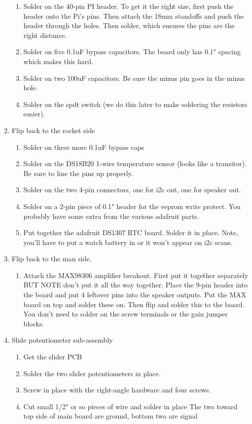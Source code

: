 \documentclass[11pt]{article}
\begin{document}
\begin{enumerate}
	\begin{enumerate}
		\item Solder on the 40-pin PI header.
			To get it the right size, first push the header onto the Pi's pins.
			Then attach the 18mm standoffs and push the header through the holes.
			Then solder, which ensures the pins are the right distance.
		\item Solder on five 0.1uF bypass capacitors.
			The board only has 0.1" spacing which makes this hard.
		\item Solder on two 100uF capacitors.
			 Be sure the minus pin goes in the minus hole.
		\item	Solder on the spdt switch
			(we do this later to make soldering the resistors easier).
	\end{enumerate}
\item	Flip back to the rocket side
	\begin{enumerate}
		\item Solder on three more 0.1uF bypass caps
		\item Solder on the DS18B20 1-wire temperature sensor (looks like
			a transitor).
                      Be sure to line the pins up properly.
		\item Solder on the two 4-pin connectors, one for i2c out, one for
			speaker out.
		\item Solder on a 2-pin piece of 0.1" header for the eeprom write
			protect.
			You probably have some extra from the various adafruit parts.
		\item Put together the adafruit DS1307 RTC board.  Solder it in place.
			Note, you'll have to put a watch battery in or it won't appear
			on i2c scans.
	\end{enumerate}
\item Flip back to the man side.
	\begin{enumerate}
		\item Attach the MAX98306 amplifier breakout.
			First put it together separately BUT NOTE don't put it all the
			way together.
			Place the 9-pin header into the board and put 4 leftover pins
			into the speaker outputs.  Put the MAX board on top and solder these on.
			Then flip and solder this to the board.  You don't need to solder on
			the screw terminals or the gain jumper blocks.
	\end{enumerate}
	
\item Slide potentiometer sub-assembly
	\begin{enumerate}
		\item Get the slider PCB
		\item Solder the two slider potentiometers in place.
		\item Screw in place with the right-angle hardware and four screws.
		\item Cut small 1/2" or so pieces of wire and solder in place
			The two toward top side of main board are ground, 
			bottom two are signal
	\end{enumerate}


\end{enumerate}
\end{document}
